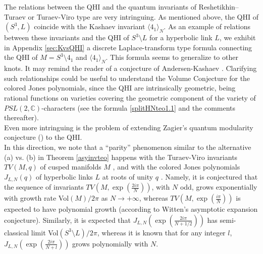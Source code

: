 \documentclass[11pt]{amsart}
\newcommand{\mc}{\mathbb{C}}
\newcommand{\ra}{\rightarrow}
\begin{document}
The relations between the QHI and the quantum invariants of Reshetikhin--Turaev or Turaev-Viro type are very intringuing. As mentioned above, the QHI of $(S^3, L)$ coincide with the Kashaev invariant $\langle 4_1\rangle_N$. As an example of relations between these invariants and the QHI of $S^3\setminus L$ for a hyperbolic link $L$, we exhibit in Appendix \ref{sec:KvsQHI} a discrete Laplace-transform type formula connecting the QHI of $M=S^3\setminus 4_1$ and $\langle 4_1\rangle_N$. This formula seems to generalize to other knots. It may remind the reader of a conjecture of Andersen-Kashaev \cite[Conjecture 1]{AK}. Clarifying such relationships could be useful to understand the Volume Conjecture for the colored Jones polynomials, since the QHI are intrinsically geometric, being rational functions on varieties covering the geometric component of the variety of $PSL(2,\mc)$-characters (see the formula \eqref{splitHNteo1.1} and the comments thereafter).\\ 
Even more intringuing is the problem of extending Zagier's quantum modularity conjecture (\cite{ZagierQM,GarZag}) to the QHI.\\
In this direction, we note that a ``parity'' phenomenon similar to the alternative (a) vs.\!\! (b) in Theorem \ref{asyinvteo} happens with the Turaev-Viro invariants $TV(M,q)$ of cusped manifolds $M$ \cite{CY}, and with the colored Jones polynomials $J_{L,N}(q)$ of hyperbolic links $L$ at roots of unity $q$ \cite{DKY}. Namely, it is conjectured that the sequence of invariants $\textstyle TV(M,\exp(\frac{2i\pi}{N}))$, with $N$ odd, grows exponentially with growth rate Vol$(M)/2\pi$ as $N\ra +\infty$, whereas $\textstyle TV(M,\exp(\frac{i\pi}{N}))$ is expected to have polynomial growth (according to Witten's asymptotic expansion conjecture). Similarly, it is expected that $\textstyle J_{L,N}(\exp(\frac{2i\pi}{N+1/2}))$ has semi-classical limit Vol$(S^3\setminus L)/2\pi$, whereas it is known that for any integer $l$, $\textstyle J_{L,N}(\exp(\frac{2i\pi}{N+l}))$ grows polynomially with $N$.
\smallskip
\end{document}

